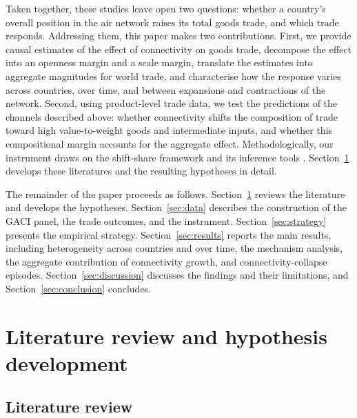 Taken together, these studies leave open two questions: whether a country's overall position in the air network raises its total goods trade, and which trade responds. Addressing them, this paper makes two contributions. First, we provide causal estimates of the effect of connectivity on goods trade, decompose the effect into an openness margin and a scale margin, translate the estimates into aggregate magnitudes for world trade, and characterise how the response varies across countries, over time, and between expansions and contractions of the network. Second, using product-level trade data, we test the predictions of the channels described above: whether connectivity shifts the composition of trade toward high value-to-weight goods and intermediate inputs, and whether this compositional margin accounts for the aggregate effect. Methodologically, our instrument draws on the shift-share framework and its inference tools \citep{GoldsmithPinkham_2020,Adao_2019,Borusyak_2022}. Section~\ref{sec:literature} develops these literatures and the resulting hypotheses in detail.

The remainder of the paper proceeds as follows. Section~\ref{sec:literature} reviews the literature and develops the hypotheses. Section~\ref{sec:data} describes the construction of the GACI panel, the trade outcomes, and the instrument. Section~\ref{sec:strategy} presents the empirical strategy. Section~\ref{sec:results} reports the main results, including heterogeneity across countries and over time, the mechanism analysis, the aggregate contribution of connectivity growth, and connectivity-collapse episodes. Section~\ref{sec:discussion} discusses the findings and their limitations, and Section~\ref{sec:conclusion} concludes. 

\section{Literature review and hypothesis development}
\label{sec:literature}
\subsection{Literature review}

